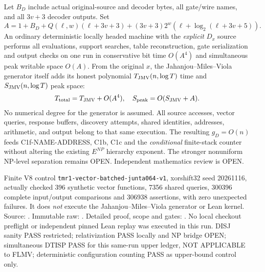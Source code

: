 \documentclass[11pt]{article}
\begin{document}
Let $B_D$ include actual original-source and decoder
bytes, all gate/wire names, and all $3v+3$ decoder outputs.
Set
\[
A=1+B_D+Q(\ell,w)(\ell+3v+3)
 +(3v+3)2^w(\ell+\log_2(\ell+3v+5)).
\]
An ordinary deterministic locally headed machine with
the \emph{explicit} $D_x$ source performs all evaluations,
support searches, table reconstruction, gate serialization
and output checks on one run in conservative bit time
$O(A^4)$ and simultaneous peak writable space $O(A)$.
From the original $x$, the Jahanjou--Miles--Viola
generator itself adds its honest polynomial
$T_{\rm JMV}(n,\log T)$ time and
$S_{\rm JMV}(n,\log T)$ peak space:
\[
T_{\rm total}=T_{\rm JMV}+O(A^4),\quad
S_{\rm peak}=O(S_{\rm JMV}+A).
\]
No numerical degree for the generator is assumed.
All source accesses, vector queries, response buffers,
discovery attempts, shared identities, addresses, arithmetic,
and output belong to that same execution.
The resulting $g_D=O(n)$ feeds C1f-NAME-ADDRESS,
C1b, C1c and the \emph{conditional} finite-stack counter
without altering the existing $E^{NP}$ hierarchy exponent.
The stronger nonuniform NP-level separation remains OPEN.
Independent mathematics review is OPEN.

Finite V8 control \texttt{tmr1-vector-batched-junta064-v1},
xorshift32 seed 20261116, actually checked 396 synthetic
vector functions, 7356 shared queries, 300396 complete
input/output comparisons and 306938 assertions, with
zero unexpected failures. It does \emph{not} execute the
Jahanjou--Miles--Viola generator or Lean kernel.
Source:
.
Immutable raw:
.
Detailed proof, scope and gates:
.
No local checkout preflight or independent pinned Lean replay
was executed in this run. DISJ sanity PASS restricted;
relativization PASS locally and NP bridge OPEN;
simultaneous DTISP PASS for this same-run upper ledger,
NOT APPLICABLE to FLMV; deterministic configuration
counting PASS as upper-bound control only.
\end{document}
